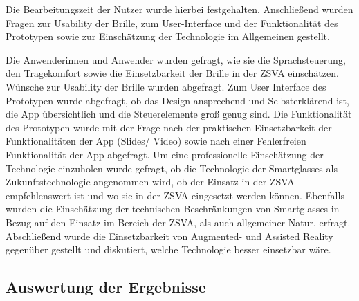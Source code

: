 Die Bearbeitungszeit der Nutzer wurde hierbei festgehalten. Anschließend wurden Fragen zur Usability der Brille, zum User-Interface und der Funktionalität des Prototypen sowie zur Einschätzung der Technologie im Allgemeinen gestellt.

Die Anwenderinnen und Anwender wurden gefragt, wie sie die Sprachsteuerung, den Tragekomfort sowie die Einsetzbarkeit der Brille in der ZSVA einschätzen. Wünsche zur Usability der Brille wurden abgefragt. Zum User Interface des Prototypen wurde abgefragt, ob das Design ansprechend und Selbsterklärend ist, die App übersichtlich und die Steuerelemente groß genug sind. Die Funktionalität des Prototypen wurde mit der Frage nach der praktischen Einsetzbarkeit der Funktionalitäten der App (Slides/ Video) sowie nach einer Fehlerfreien Funktionalität der App abgefragt. Um eine professionelle Einschätzung der Technologie einzuholen wurde gefragt, ob die Technologie der Smartglasses als Zukunftstechnologie angenommen wird, ob der Einsatz in der ZSVA empfehlenswert ist und wo sie in der ZSVA eingesetzt werden können. Ebenfalls wurden die Einschätzung der technischen Beschränkungen von Smartglasses in Bezug auf den Einsatz im Bereich der ZSVA, als auch allgemeiner Natur, erfragt. Abschließend wurde die Einsetzbarkeit von Augmented- und Assisted Reality gegenüber gestellt und diskutiert, welche Technologie besser einsetzbar wäre.
%
%
%
%
%
%
%
\subsection{Auswertung der Ergebnisse}
\label{sec:Auswertung_der_Ergebnisse}
